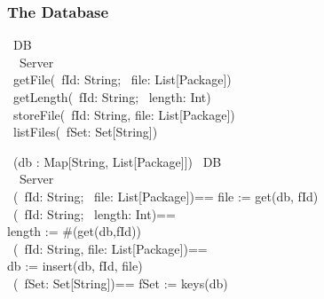 \documentclass[handout]
{beamer}
\begin{document}
\begin{frame}
\frametitle{The Database}

\begin{small}
\INTERFACE\ DB\\
\BEGIN\ \WITH\ Server\\
\innrykk \innrykk \OP\ getFile(\IN\ fId: String; \OUT\ file: List[Package])\\
\innrykk \innrykk \OP\ getLength(\IN\ fId: String; \OUT\ length: Int)\\
\innrykk \innrykk \OP\ storeFile(\IN\ fId: String, file: List[Package])\\
\innrykk \innrykk \OP\ listFiles(\OUT\ fSet: Set[String])\\
\END
\end{small}

\bigskip
\pause


\medskip
\pause

\begin{small}
\CLASS\ (db : Map[String, List[Package]]) \IMPLEMENTS\ DB\\
\BEGIN\ \WITH\ Server\\
\innrykk \innrykk \OP\ (\IN\ fId: String; \OUT\ file: List[Package])== file := get(db, fId)\\
\innrykk \innrykk \OP\ (\IN\ fId: String; \OUT\ length: Int)== \\
\innrykk \innrykk \innrykk \innrykk \innrykk \innrykk length := \#(get(db,fId))\\
\innrykk \innrykk \OP\ (\IN\ fId: String, file: List[Package])==\\
\innrykk \innrykk \innrykk \innrykk \innrykk \innrykk  db := insert(db, fId, file)\\
\innrykk \innrykk \OP\ (\OUT\ fSet: Set[String])== fSet := keys(db)\\
\END
\end{small}

\end{frame}
\end{document}
